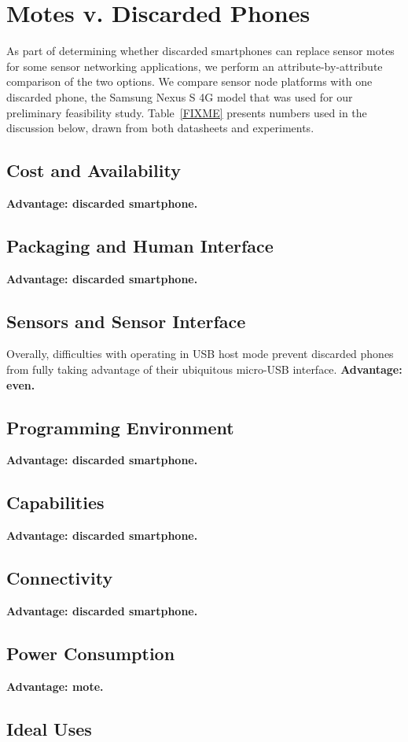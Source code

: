 \section{Motes v. Discarded Phones}
\label{sec-comparison}



As part of determining whether discarded smartphones can replace sensor motes
for some sensor networking applications, we perform an attribute-by-attribute
comparison of the two options. We compare  sensor node
platforms with one discarded phone, the Samsung Nexus S 4G model that was
used for our preliminary feasibility study. Table~\ref{FIXME} presents
numbers used in the discussion below, drawn from both datasheets and
experiments.

\subsection{Cost and Availability}

\textbf{Advantage: discarded smartphone.}

\subsection{Packaging and Human Interface}

\textbf{Advantage: discarded smartphone.}

\subsection{Sensors and Sensor Interface}

Overally, difficulties with operating in USB host mode prevent discarded
phones from fully taking advantage of their ubiquitous micro-USB interface.
\textbf{Advantage: even.}

\subsection{Programming Environment}

\textbf{Advantage: discarded smartphone.}

\subsection{Capabilities}

\textbf{Advantage: discarded smartphone.}

\subsection{Connectivity}

\textbf{Advantage: discarded smartphone.}

\subsection{Power Consumption}

\textbf{Advantage: mote.}

\subsection{Ideal Uses}
